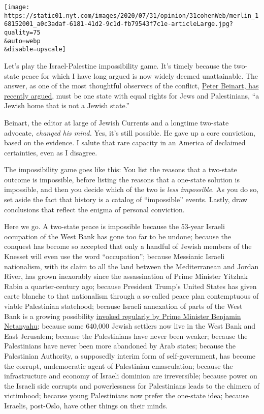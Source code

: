 \texttt{[image: https://static01.nyt.com/images/2020/07/31/opinion/31cohenWeb/merlin\_168152001\_a0c3adaf-6181-41d2-9c1d-fb79543f7c1e-articleLarge.jpg?quality=75\\\&auto=webp\\\&disable=upscale]}

Let's play the Israel-Palestine impossibility game. It's timely because
the two-state peace for which I have long argued is now widely deemed
unattainable. The answer, as one of the most thoughtful observers of the
conflict,
\href{https://www.nytimes.com/2020/07/08/opinion/israel-annexation-two-state-solution.html}{Peter
Beinart, has recently argued}, must be one state with equal rights for
Jews and Palestinians, ``a Jewish home that is not a Jewish state.''

Beinart, the editor at large of Jewish Currents and a longtime two-state
advocate, \emph{changed his mind.} Yes, it's still possible. He gave up
a core conviction, based on the evidence. I salute that rare capacity in
an America of declaimed certainties, even as I disagree.

The impossibility game goes like this: You list the reasons that a
two-state outcome is impossible, before listing the reasons that a
one-state solution is impossible, and then you decide which of the two
is \emph{less impossible.} As you do so, set aside the fact that history
is a catalog of ``impossible'' events. Lastly, draw conclusions that
reflect the enigma of personal conviction.

Here we go. A two-state peace is impossible because the 53-year Israeli
occupation of the West Bank has gone too far to be undone; because the
conquest has become so accepted that only a handful of Jewish members of
the Knesset will even use the word ``occupation''; because Messianic
Israeli nationalism, with its claim to all the land between the
Mediterranean and Jordan River, has grown inexorably since the
assassination of Prime Minister Yitzhak Rabin a quarter-century ago;
because President Trump's United States has given carte blanche to that
nationalism through a so-called peace plan contemptuous of viable
Palestinian statehood; because Israeli annexation of parts of the West
Bank is a growing possibility
\href{https://www.nytimes.com/2020/01/28/world/middleeast/israel-west-bank-annex-sovereignty.html}{invoked
regularly by Prime Minister Benjamin Netanyahu}; because some 640,000
Jewish settlers now live in the West Bank and East Jerusalem; because
the Palestinians have never been weaker; because the Palestinians have
never been more abandoned by Arab states; because the Palestinian
Authority, a supposedly interim form of self-government, has become the
corrupt, undemocratic agent of Palestinian emasculation; because the
infrastructure and economy of Israeli dominion are irreversible; because
power on the Israeli side corrupts and powerlessness for Palestinians
leads to the chimera of victimhood; because young Palestinians now
prefer the one-state idea; because Israelis, post-Oslo, have other
things on their minds.

